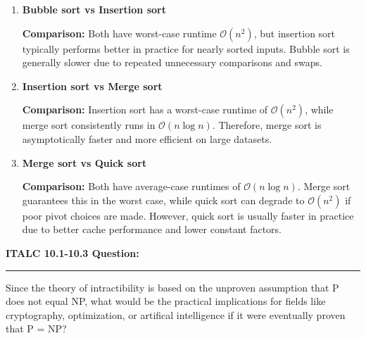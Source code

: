 \documentclass{article}
\theoremstyle{theorem}
\theoremstyle{definition}
\theoremstyle{remark}
\begin{document}
\begin{enumerate}
    \item \textbf{Bubble sort vs Insertion sort}

    \textbf{Comparison:} Both have worst-case runtime \( \mathcal{O}(n^2) \), but insertion sort typically performs better in practice for nearly sorted inputs. Bubble sort is generally slower due to repeated unnecessary comparisons and swaps.

    \item \textbf{Insertion sort vs Merge sort}

    \textbf{Comparison:} Insertion sort has a worst-case runtime of \( \mathcal{O}(n^2) \), while merge sort consistently runs in \( \mathcal{O}(n \log n) \). Therefore, merge sort is asymptotically faster and more efficient on large datasets.

    \item \textbf{Merge sort vs Quick sort}

    \textbf{Comparison:} Both have average-case runtimes of \( \mathcal{O}(n \log n) \). Merge sort guarantees this in the worst case, while quick sort can degrade to \( \mathcal{O}(n^2) \) if poor pivot choices are made. However, quick sort is usually faster in practice due to better cache performance and lower constant factors.
\end{enumerate}

\textbf{ITALC 10.1-10.3 Question:}
\vspace{0.5em}
\hrule
\vspace{0.5em}
Since the theory of intractibility is based on the unproven assumption that P does not equal NP, what would be the practical implications for fields like cryptography, optimization, or artifical intelligence if it were eventually proven that P = NP?
\end{document}
